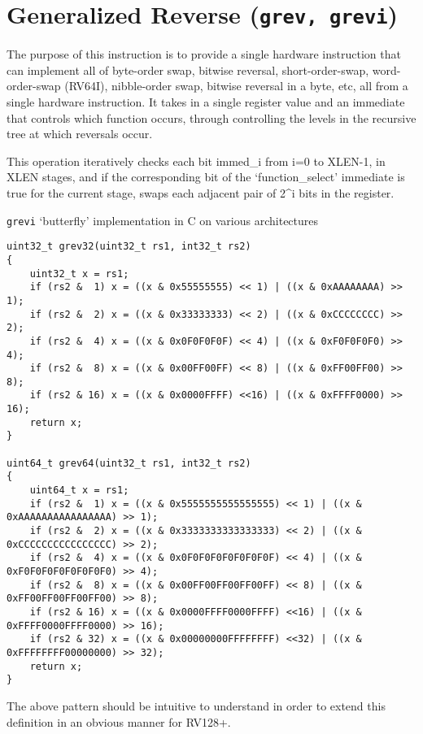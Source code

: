 
\section{Generalized Reverse (\texttt{grev,\ grevi})}

The purpose of this instruction is to provide a single hardware
instruction that can implement all of byte-order swap, bitwise reversal,
short-order-swap, word-order-swap (RV64I), nibble-order swap, bitwise
reversal in a byte, etc, all from a single hardware instruction. It
takes in a single register value and an immediate that controls which
function occurs, through controlling the levels in the recursive tree at
which reversals occur.

This operation iteratively checks each bit immed\_i from i=0 to XLEN-1,
in XLEN stages, and if the corresponding bit of the `function\_select'
immediate is true for the current stage, swaps each adjacent pair of
2\^{}i bits in the register.

\texttt{grevi} `butterfly' implementation in C on various architectures

\begin{verbatim}
uint32_t grev32(uint32_t rs1, int32_t rs2)
{
    uint32_t x = rs1;
    if (rs2 &  1) x = ((x & 0x55555555) << 1) | ((x & 0xAAAAAAAA) >> 1);
    if (rs2 &  2) x = ((x & 0x33333333) << 2) | ((x & 0xCCCCCCCC) >> 2);
    if (rs2 &  4) x = ((x & 0x0F0F0F0F) << 4) | ((x & 0xF0F0F0F0) >> 4);
    if (rs2 &  8) x = ((x & 0x00FF00FF) << 8) | ((x & 0xFF00FF00) >> 8);
    if (rs2 & 16) x = ((x & 0x0000FFFF) <<16) | ((x & 0xFFFF0000) >> 16);
    return x;
}

uint64_t grev64(uint32_t rs1, int32_t rs2)
{
    uint64_t x = rs1;
    if (rs2 &  1) x = ((x & 0x5555555555555555) << 1) | ((x & 0xAAAAAAAAAAAAAAAA) >> 1);
    if (rs2 &  2) x = ((x & 0x3333333333333333) << 2) | ((x & 0xCCCCCCCCCCCCCCCC) >> 2);
    if (rs2 &  4) x = ((x & 0x0F0F0F0F0F0F0F0F) << 4) | ((x & 0xF0F0F0F0F0F0F0F0) >> 4);
    if (rs2 &  8) x = ((x & 0x00FF00FF00FF00FF) << 8) | ((x & 0xFF00FF00FF00FF00) >> 8);
    if (rs2 & 16) x = ((x & 0x0000FFFF0000FFFF) <<16) | ((x & 0xFFFF0000FFFF0000) >> 16);
    if (rs2 & 32) x = ((x & 0x00000000FFFFFFFF) <<32) | ((x & 0xFFFFFFFF00000000) >> 32);
    return x;
}
\end{verbatim}

The above pattern should be intuitive to understand in order to extend
this definition in an obvious manner for RV128+.


